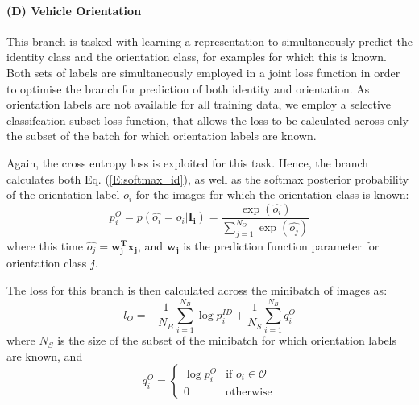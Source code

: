 \documentclass[10pt,twocolumn,letterpaper]{article}
\begin{document}
\paragraph{(D) Vehicle Orientation}

This branch is tasked with learning a representation to simultaneously predict the identity class and the orientation class, for examples for which this is known.
Both sets of labels are simultaneously employed in a joint loss function in order to optimise the branch for prediction of both identity and orientation. As orientation labels are not available for all training data, we employ a selective classifcation subset loss function, that allows the loss to be calculated across only the subset of the batch for which orientation labels are known.

Again, the cross entropy loss is exploited for this task. Hence, the branch calculates both Eq. (\ref{E:softmax_id}), as well as the softmax posterior probability of the orientation label $o_i$ for the images for which the orientation class is known:
\begin{equation}
  p_i^{O} = p(\hat{o_i} = o_i|\mathbf{I_i}) = \frac{\exp(\hat{o_i})}{\sum_{j=1}^{N_{O}}\exp(\hat{o_j})}
\end{equation}
where this time $\hat{o_j} = \mathbf{w_j^Tx_j}$, and $\mathbf{w_j}$ is the prediction function parameter for orientation class $\emph{j}$.

The loss for this branch is then calculated across the minibatch of images as:
\begin{equation}
  l_{O} = -\frac{1}{N_B} \sum_{i=1}^{N_B}\log{p_i^{ID}} + \frac{1}{N_S} \sum_{i=1}^{N_B}q_i^O
\end{equation}
where $N_S$ is the size of the subset of the minibatch for which orientation labels are known, and
\[
q_i^O =
\begin{cases}
    \log{p_i^{O}} & \text{if } o_i \in \mathcal{O} \\
    0 & \text{otherwise}
\end{cases}
\]

\end{document}

